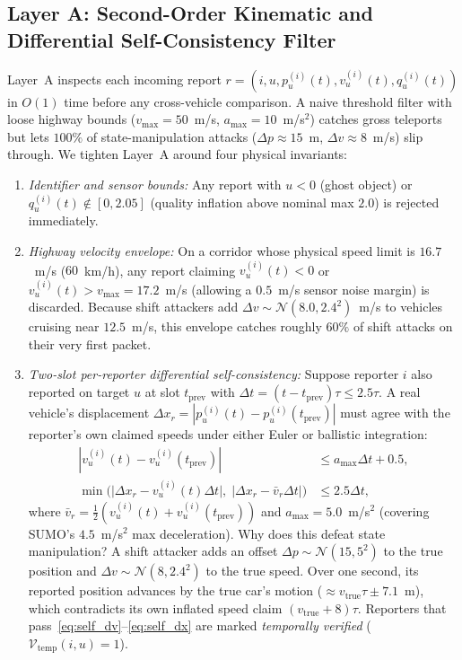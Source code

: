 \documentclass[conference]{IEEEtran}
\begin{document}
\subsection{Layer A: Second-Order Kinematic and Differential Self-Consistency Filter}
Layer~A inspects each incoming report $r=(i, u, p^{(i)}_u(t), v^{(i)}_u(t), q^{(i)}_u(t))$ in $O(1)$ time before any cross-vehicle comparison. A naive threshold filter with loose highway bounds ($v_{\max}=50$~m/s, $a_{\max}=10$~m/s$^2$) catches gross teleports but lets $100\%$ of state-manipulation attacks ($\Delta p\approx 15$~m, $\Delta v\approx 8$~m/s) slip through. We tighten Layer~A around four physical invariants:
\begin{enumerate}
\item \textit{Identifier and sensor bounds:} Any report with $u < 0$ (ghost object) or $q^{(i)}_u(t)\notin [0, 2.05]$ (quality inflation above nominal max $2.0$) is rejected immediately.
\item \textit{Highway velocity envelope:} On a corridor whose physical speed limit is $16.7$~m/s ($60$~km/h), any report claiming $v^{(i)}_u(t) < 0$ or $v^{(i)}_u(t) > v_{\max} = 17.2$~m/s (allowing a $0.5$~m/s sensor noise margin) is discarded. Because shift attackers add $\Delta v\sim\mathcal{N}(8.0, 2.4^2)$~m/s to vehicles cruising near $12.5$~m/s, this envelope catches roughly $60\%$ of shift attacks on their very first packet.
\item \textit{Two-slot per-reporter differential self-consistency:} Suppose reporter $i$ also reported on target $u$ at slot $t_{\mathrm{prev}}$ with $\Delta t = (t - t_{\mathrm{prev}})\tau \le 2.5\tau$. A real vehicle's displacement $\Delta x_r = |p^{(i)}_u(t) - p^{(i)}_u(t_{\mathrm{prev}})|$ must agree with the reporter's own claimed speeds under either Euler or ballistic integration:
\begin{align}
|v^{(i)}_u(t) - v^{(i)}_u(t_{\mathrm{prev}})| &\le a_{\max}\Delta t + 0.5, \label{eq:self_dv}\\
\min\!\Big(\big|\Delta x_r - v^{(i)}_u(t)\Delta t\big|,\;\big|\Delta x_r - \bar{v}_r\Delta t\big|\Big) &\le 2.5\Delta t, \label{eq:self_dx}
\end{align}
where $\bar{v}_r = \frac{1}{2}(v^{(i)}_u(t) + v^{(i)}_u(t_{\mathrm{prev}}))$ and $a_{\max}=5.0$~m/s$^2$ (covering SUMO's $4.5$~m/s$^2$ max deceleration). Why does this defeat state manipulation? A shift attacker adds an offset $\Delta p\sim\mathcal{N}(15,5^2)$ to the true position and $\Delta v\sim\mathcal{N}(8,2.4^2)$ to the true speed. Over one second, its reported position advances by the true car's motion ($\approx v_{\mathrm{true}}\tau \pm 7.1$~m), which contradicts its own inflated speed claim $(v_{\mathrm{true}}+8)\tau$. Reporters that pass~\eqref{eq:self_dv}--\eqref{eq:self_dx} are marked \emph{temporally verified} ($\mathcal{V}_{\mathrm{temp}}(i,u)=1$).

\end{enumerate}
\end{document}
